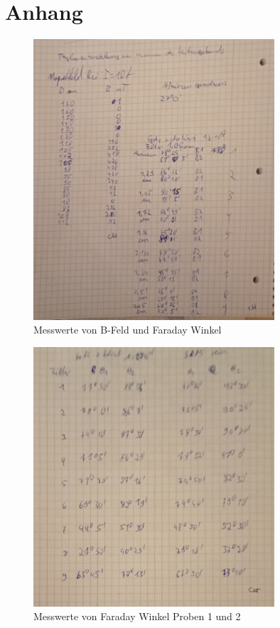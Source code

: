 \section*{Anhang}
\begin{figure}[H]
    \centering
    \includegraphics[width=0.8\textwidth]{Bilder/Daten_V46.pdf} 
    \caption{Messwerte von B-Feld und Faraday Winkel}
    \label{fig:Messwert1}
\end{figure}
\begin{figure}[H]
    \centering
    \includegraphics[width=0.8\textwidth]{Bilder/Daten_V46.png} 
    \caption{Messwerte von Faraday Winkel Proben 1 und 2}
    \label{fig:Messwert2}
\end{figure}
